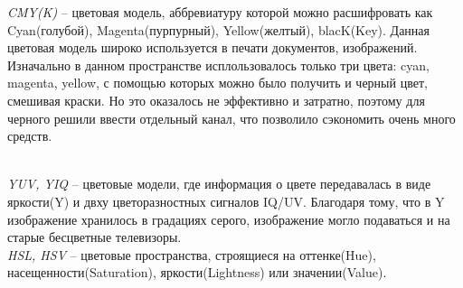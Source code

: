 \begin{figure}[ht!]
\end{figure}

\textit{CMY(K)} -- цветовая модель, аббревиатуру которой можно расшифровать как Cyan(голубой), Magenta(пурпурный), Yellow(желтый), blacK(Key). Данная цветовая модель широко используется в печати документов, изображений. Изначально в данном пространстве исплользовалось только три цвета: cyan, magenta, yellow, с помощью которых можно было получить и черный цвет, смешивая краски. Но это оказалось не эффективно и затратно, поэтому для черного решили ввести отдельный канал, что позволило сэкономить очень много средств.

\begin{figure}[ht!]
\end{figure}\\

\textit{YUV, YIQ} -- цветовые модели, где информация о цвете передавалась в виде яркости(Y) и двху цветоразностных сигналов IQ/UV. Благодаря тому, что в Y изображение хранилось в градациях серого, изображение могло подаваться и на старые бесцветные телевизоры.\\

\textit{HSL, HSV} -- цветовые пространства, строящиеся на оттенке(Hue), насещенности(Saturation), яркости(Lightness) или значении(Value).

